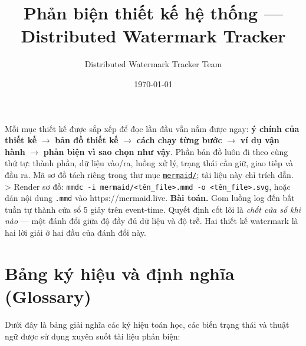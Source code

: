 \documentclass[12pt,a4paper]{article}
\title{Phản biện thiết kế hệ thống --- Distributed Watermark Tracker}
\author{Distributed Watermark Tracker Team}
\date{\today}
\begin{document}
\maketitle
\tableofcontents
\newpage
Mỗi mục thiết kế được sắp xếp để đọc lần đầu vẫn nắm được ngay: \textbf{ý chính của thiết kế} $\rightarrow$ \textbf{bản đồ thiết kế} $\rightarrow$ \textbf{cách chạy từng bước} $\rightarrow$ \textbf{ví dụ vận hành} $\rightarrow$ \textbf{phản biện vì sao chọn như vậy}. Phần bản đồ luôn đi theo cùng thứ tự: thành phần, dữ liệu vào/ra, luồng xử lý, trạng thái cần giữ, giao tiếp và đầu ra. Mã sơ đồ tách riêng trong thư mục \href{mermaid/}{\texttt{mermaid/}}; tài liệu này chỉ trích dẫn.
> Render sơ đồ: \texttt{mmdc -i mermaid/<tên\_file>.mmd -o <tên\_file>.svg}, hoặc dán nội dung \texttt{.mmd} vào https://mermaid.live.
\textbf{Bài toán.} Gom luồng log đến bất tuần tự thành cửa sổ 5 giây trên event-time. Quyết định cốt lõi là \textit{chốt cửa sổ khi nào} — một đánh đổi giữa độ đầy đủ dữ liệu và độ trễ. Hai thiết kế watermark là hai lời giải ở hai đầu của đánh đổi này.

\section{Bảng ký hiệu và định nghĩa (Glossary)}
\label{sec:notations}
Dưới đây là bảng giải nghĩa các ký hiệu toán học, các biến trạng thái và thuật ngữ được sử dụng xuyên suốt tài liệu phản biện:
\end{document}
